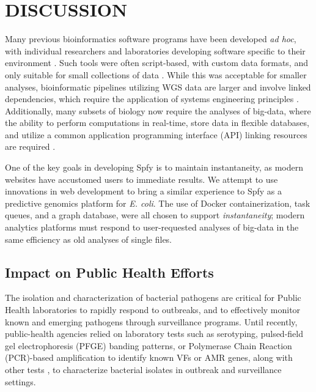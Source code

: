 \documentclass[a4,center,fleqn]{NAR}
\begin{document}


\section{DISCUSSION}

Many previous bioinformatics software programs have been developed \textit{ad hoc}, with individual researchers and laboratories developing software specific to their environment \cite{de2015trends}.
Such tools were often script-based, with custom data formats, and only suitable for small collections of data \cite{de2015trends}.
While this was acceptable for smaller analyses, bioinformatic pipelines utilizing WGS data are larger and involve linked dependencies, which require the application of systems engineering principles \cite{schatz2015biological}.
Additionally, many subsets of biology now require the analyses of big-data, where the ability to perform computations in real-time, store data in flexible databases, and utilize a common application programming interface (API) linking resources are required \cite{swaminathan2016review}.

One of the key goals in developing Spfy is to maintain instantaneity, as modern websites have accustomed users to immediate results.
We attempt to use innovations in web development to bring a similar experience to Spfy as a predictive genomics platform for \textit{E. coli}.
The use of Docker containerization, task queues, and a graph database, were all chosen to support \textit{instantaneity}; modern analytics platforms must respond to user-requested analyses of big-data in the same efficiency as old analyses of single files.

\subsection{Impact on Public Health Efforts}

The isolation and characterization of bacterial pathogens are critical for Public Health laboratories to rapidly respond to outbreaks, and to effectively monitor known and emerging pathogens through surveillance programs.
Until recently, public-health agencies relied on laboratory tests such as serotyping, pulsed-field gel electrophoresis (PFGE) banding patterns, or Polymerase Chain Reaction (PCR)-based amplification to identify known VFs or AMR genes, along with other tests \cite{ronholm2016navigating}, to characterize bacterial isolates in outbreak and surveillance settings.
\end{document}
